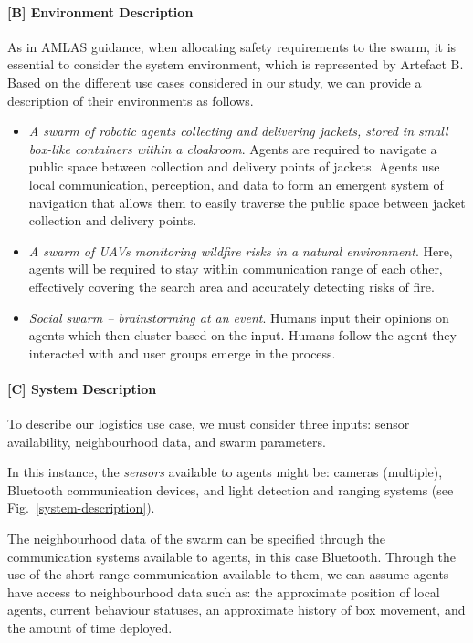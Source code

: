 \documentclass[lettersize,journal]{IEEEtran}
\begin{document}
\paragraph*{[B] Environment Description}
As in AMLAS guidance, when allocating safety requirements to the swarm, it is essential to consider the system environment, which is represented by Artefact B. 
Based on the different use cases considered in our study, we can provide a description of their environments as follows.
\begin{itemize}
	\item \textit{A swarm of robotic agents collecting and delivering jackets, stored in small box-like containers within a cloakroom}. Agents are required to navigate a public space between collection and delivery points of jackets. Agents use local communication, perception, and data to form an emergent system of navigation that allows them to easily traverse the public space between jacket collection and delivery points.
	\item \textit{A swarm of UAVs monitoring wildfire risks in a natural environment}. Here, agents will be required to stay within communication range of each other, effectively covering the search area and accurately detecting risks of fire.
	\item \textit{Social swarm – brainstorming at an event}. Humans input their opinions on agents which then cluster based on the input. Humans follow the agent they interacted with and user groups emerge in the process.
\end{itemize}

\paragraph*{[C] System Description}
To describe our logistics use case, we must consider three inputs: sensor availability, neighbourhood data, and swarm parameters. 

In this instance, the \textit{sensors} available to agents might be: cameras (multiple), Bluetooth communication devices, and light detection and ranging systems (see Fig.~\ref{system-description}). 

The neighbourhood data of the swarm can be specified through the communication systems available to agents, in this case Bluetooth. Through the use of the short range communication available to them, we can assume agents have access to neighbourhood data such as: the approximate position of local agents, current behaviour statuses, an approximate history of box movement, and the amount of time deployed. 
\end{document}
